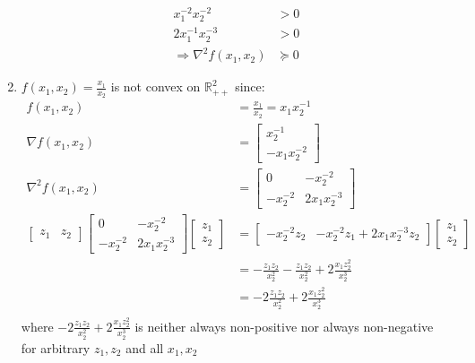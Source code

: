 \documentclass[oneside, a4paper]{book}
\begin{document}
\begin{enumerate}
\begin{align*}
        x_1^{-2} x_2^{-2} &> 0\\
        2x_1^{-1} x_2^{-3} &> 0\\
        \Longrightarrow \nabla^2 f(x_1,x_2) &\succeq 0
    \end{align*}
    \item $f(x_1,x_2) = \frac{x_1}{x_2}$ is not convex on $\mathds{R}^2_{++}$ since:
    \begin{align*}
        f(x_1,x_2) &= \frac{x_1}{x_2} = x_1 x_2^{-1}\\
        \nabla f(x_1,x_2) &= \begin{bmatrix}
            x_2^{-1} \\
            -x_1 x_2^{-2}
        \end{bmatrix}\\
        \nabla^2 f(x_1,x_2) &= \begin{bmatrix}
            0 & -x_2^{-2}\\
            -x_2^{-2} & 2x_1x_2^{-3}
        \end{bmatrix}\\
        \begin{bmatrix}z_1 & z_2\end{bmatrix}\begin{bmatrix}0 & -x_2^{-2}\\-x_2^{-2} & 2x_1x_2^{-3}\end{bmatrix}\begin{bmatrix}z_1 \\ z_2\end{bmatrix} &= \begin{bmatrix}
            -x_2^{-2}z_2 & -x_2^{-2}z_1 + 2x_1x_2^{-3}z_2
        \end{bmatrix}\begin{bmatrix}z_1 \\ z_2\end{bmatrix}\\
        &= -\frac{z_1z_2}{x_2^2} -\frac{z_1z_2}{x_2^{2}} + 2\frac{x_1z_2^2}{x_2^{3}}\\
        &= -2\frac{z_1z_2}{x_2^2} + 2\frac{x_1z_2^2}{x_2^{3}}\\
    \end{align*}
    where $-2\frac{z_1z_2}{x_2^2} + 2\frac{x_1z_2^2}{x_2^{3}}$ is neither always non-positive nor always non-negative for arbitrary $z_1,z_2$ and all $x_1, x_2$
\end{enumerate}
\end{document}
